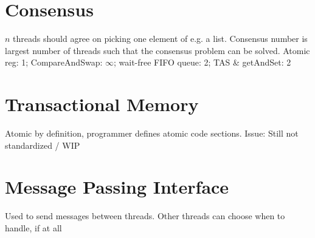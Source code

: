 \documentclass{article}
\begin{document}
\section{Consensus}
$n$ threads should agree on picking one element of e.g. a list. Consensus number is largest number of threads such that the consensus problem can be solved.
\shortex \smallhspace Atomic reg: 1; CompareAndSwap: $\infty$; wait-free FIFO queue: 2; TAS \& getAndSet: 2

\section{Transactional Memory}
Atomic by definition, programmer defines atomic code sections. Issue: Still not standardized / WIP


\section{Message Passing Interface}
Used to send messages between threads. Other threads can choose when to handle, if at all
\end{document}
